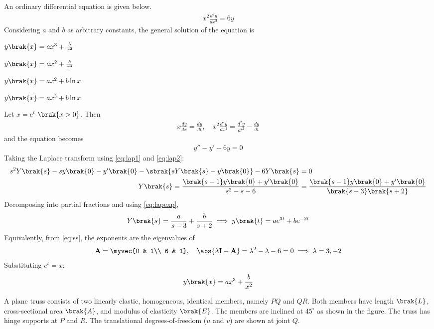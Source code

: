 \begin{enumerate}[label=1.2.\arabic*,leftmargin=*,labelsep=0.8em,itemsep=2ex]
\problem An ordinary differential equation is given below.
\begin{align}
x^2\frac{d^2y}{dx^2} = 6y
\end{align}
Considering $a$ and $b$ as arbitrary constants, the general solution of the equation is \gate
\begin{options}
\item $y\brak{x} = ax^3 + \frac{b}{x^2}$
\item $y\brak{x} = ax^2 + \frac{b}{x^3}$
\item $y\brak{x} = ax^2 + b\ln x$
\item $y\brak{x} = ax^3 + b\ln x$
\end{options}
\solution Let $x = e^t$ $\brak{x > 0}$. Then
\begin{align}
x\frac{dy}{dx} = \frac{dy}{dt},\quad x^2\frac{d^2y}{dx^2} = \frac{d^2y}{dt^2} - \frac{dy}{dt}
\end{align}
and the equation becomes
\begin{align}
y'' - y' - 6y = 0
\label{eq:q37t}
\end{align}
Taking the Laplace transform using \eqref{eq:lap1} and \eqref{eq:lap2}:
\begin{align}
s^2Y\brak{s} - sy\brak{0} - y'\brak{0} - \sbrak{sY\brak{s} - y\brak{0}} - 6Y\brak{s} &= 0\\
Y\brak{s} = \frac{\brak{s-1}y\brak{0} + y'\brak{0}}{s^2 - s - 6} &= \frac{\brak{s-1}y\brak{0} + y'\brak{0}}{\brak{s-3}\brak{s+2}}
\end{align}
Decomposing into partial fractions and using \eqref{eq:lapexp},
\begin{align}
Y\brak{s} = \frac{a}{s-3} + \frac{b}{s+2} \implies y\brak{t} = ae^{3t} + be^{-2t}
\end{align}
Equivalently, from \eqref{eq:ss}, the exponents are the eigenvalues of
\begin{align}
\mathbf{A} = \myvec{0 & 1\\ 6 & 1},\quad \abs{\lambda\mathbf{I} - \mathbf{A}} = \lambda^2 - \lambda - 6 = 0 \implies \lambda = 3, -2
\end{align}
Substituting $e^t = x$:
\begin{align}
y\brak{x} = ax^3 + \frac{b}{x^2}
\end{align}

\problem A plane truss consists of two linearly elastic, homogeneous, identical members, namely $PQ$ and $QR$. Both members have length $\brak{L}$, cross-sectional area $\brak{A}$, and modulus of elasticity $\brak{E}$. The members are inclined at $45^\circ$ as shown in the figure. The truss has hinge supports at $P$ and $R$. The translational degrees-of-freedom ($u$ and $v$) are shown at joint $Q$.


\end{enumerate}
